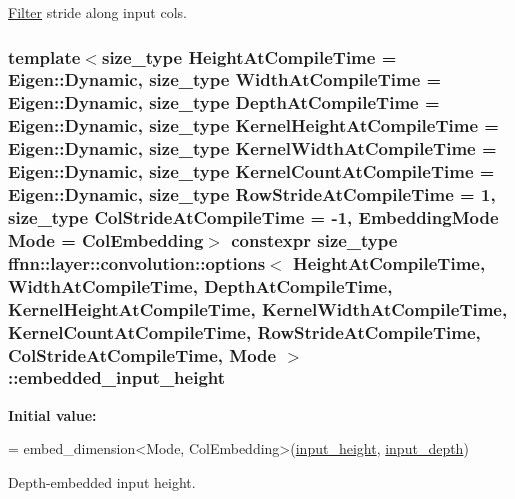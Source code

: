 \hyperlink{structffnn_1_1layer_1_1convolution_1_1_filter}{Filter} stride along input cols. 

\hypertarget{structffnn_1_1layer_1_1convolution_1_1options_a82e23d83d4ff1217b6aec5e49c94785e}{
\subsubsection[{embedded\-\_\-input\-\_\-height}]{\setlength{\rightskip}{0pt plus 5cm}template$<$size\-\_\-type Height\-At\-Compile\-Time = Eigen\-::\-Dynamic, size\-\_\-type Width\-At\-Compile\-Time = Eigen\-::\-Dynamic, size\-\_\-type Depth\-At\-Compile\-Time = Eigen\-::\-Dynamic, size\-\_\-type Kernel\-Height\-At\-Compile\-Time = Eigen\-::\-Dynamic, size\-\_\-type Kernel\-Width\-At\-Compile\-Time = Eigen\-::\-Dynamic, size\-\_\-type Kernel\-Count\-At\-Compile\-Time = Eigen\-::\-Dynamic, size\-\_\-type Row\-Stride\-At\-Compile\-Time = 1, size\-\_\-type Col\-Stride\-At\-Compile\-Time = -\/1, Embedding\-Mode Mode = Col\-Embedding$>$ constexpr {\bf size\-\_\-type} {\bf ffnn\-::layer\-::convolution\-::options}$<$ Height\-At\-Compile\-Time, Width\-At\-Compile\-Time, Depth\-At\-Compile\-Time, Kernel\-Height\-At\-Compile\-Time, Kernel\-Width\-At\-Compile\-Time, Kernel\-Count\-At\-Compile\-Time, Row\-Stride\-At\-Compile\-Time, Col\-Stride\-At\-Compile\-Time, Mode $>$\-::embedded\-\_\-input\-\_\-height\hspace{0.3cm}{\ttfamily [static]}}}\label{structffnn_1_1layer_1_1convolution_1_1options_a82e23d83d4ff1217b6aec5e49c94785e}
{\bfseries Initial value\-:}
\begin{DoxyCode}
=
    embed\_dimension<Mode, ColEmbedding>(\hyperlink{structffnn_1_1layer_1_1convolution_1_1options_aabb3c99df1150983902ebf9741a22a1a}{input\_height}, \hyperlink{structffnn_1_1layer_1_1convolution_1_1options_a5c928d8733be98927ccd22d009739deb}{input\_depth})
\end{DoxyCode}


Depth-\/embedded input height. 

